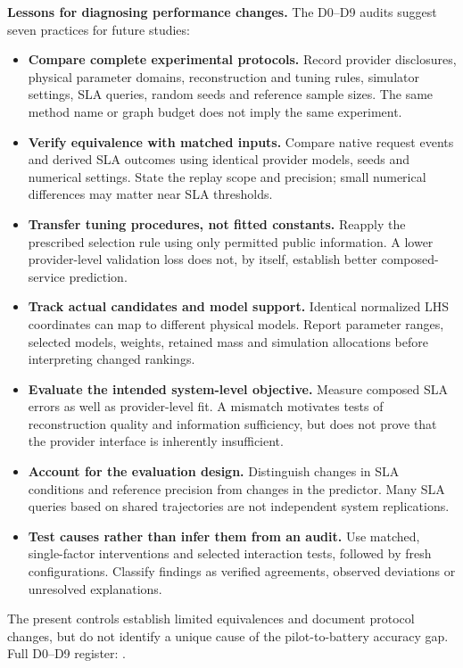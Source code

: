 \documentclass[10pt,a4paper]{article}
\begin{document}
\textbf{Lessons for diagnosing performance changes.} The D0--D9 audits suggest seven practices for future studies:
\begin{itemize}
\item \textbf{Compare complete experimental protocols.} Record provider disclosures, physical parameter domains, reconstruction and tuning rules, simulator settings, SLA queries, random seeds and reference sample sizes. The same method name or graph budget does not imply the same experiment.
\item \textbf{Verify equivalence with matched inputs.} Compare native request events and derived SLA outcomes using identical provider models, seeds and numerical settings. State the replay scope and precision; small numerical differences may matter near SLA thresholds.
\item \textbf{Transfer tuning procedures, not fitted constants.} Reapply the prescribed selection rule using only permitted public information. A lower provider-level validation loss does not, by itself, establish better composed-service prediction.
\item \textbf{Track actual candidates and model support.} Identical normalized LHS coordinates can map to different physical models. Report parameter ranges, selected models, weights, retained mass and simulation allocations before interpreting changed rankings.
\item \textbf{Evaluate the intended system-level objective.} Measure composed SLA errors as well as provider-level fit. A mismatch motivates tests of reconstruction quality and information sufficiency, but does not prove that the provider interface is inherently insufficient.
\item \textbf{Account for the evaluation design.} Distinguish changes in SLA conditions and reference precision from changes in the predictor. Many SLA queries based on shared trajectories are not independent system replications.
\item \textbf{Test causes rather than infer them from an audit.} Use matched, single-factor interventions and selected interaction tests, followed by fresh configurations. Classify findings as verified agreements, observed deviations or unresolved explanations.
\end{itemize}
The present controls establish limited equivalences and document protocol changes, but do not identify a unique cause of the pilot-to-battery accuracy gap. Full D0--D9 register: .
\end{document}
